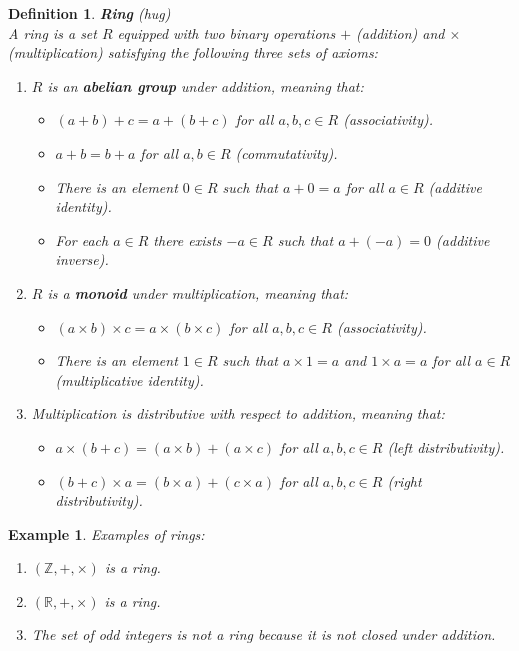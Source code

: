 \documentclass[11pt]{book} %
\newtheorem{definition}{Definition}[section]
\newtheorem*{example*}{Example}
\begin{document}
\begin{definition}{\textbf{Ring} (hug)} \\
    A ring is a set \(R\) equipped with two binary operations \(+\) (addition) and \(\times\) (multiplication) satisfying the following three sets of axioms:
    \begin{enumerate}
        \item \(R\) is an \textbf{abelian group} under addition, meaning that:
        \begin{itemize}
            \item \((a + b) + c = a + (b + c)\) for all \(a, b, c \in R\) (associativity).
            \item \(a + b = b + a\) for all \(a, b \in R\) (commutativity).
            \item There is an element \(0 \in R\) such that \(a + 0 = a\) for all \(a \in R\) (additive identity).
            \item For each \(a \in R\) there exists \(-a \in R\) such that \(a + (-a) = 0\) (additive inverse).
        \end{itemize}
        \item \(R\) is a \textbf{monoid} under multiplication, meaning that:
        \begin{itemize}
            \item \((a \times b) \times c = a \times (b \times c)\) for all \(a, b, c \in R\) (associativity).
            \item There is an element \(1 \in R\) such that \(a \times 1 = a\) and \(1 \times a = a\) for all \(a \in R\) (multiplicative identity).
        \end{itemize}
        \item Multiplication is distributive with respect to addition, meaning that:
        \begin{itemize}
            \item \(a \times (b + c) = (a \times b) + (a \times c)\) for all \(a, b, c \in R\) (left distributivity).
            \item \((b + c) \times a = (b \times a) + (c \times a)\) for all \(a, b, c \in R\) (right distributivity).
        \end{itemize}
    \end{enumerate}
\end{definition}

\begin{example*}
Examples of rings:
\begin{enumerate}
\item \( (\mathbb{Z}, +, \times) \) is a ring.
\item \( (\mathbb{R}, +, \times) \) is a ring.
\item The set of odd integers is not a ring because it is not closed under addition.
\end{enumerate}
\end{example*}
\end{document}
